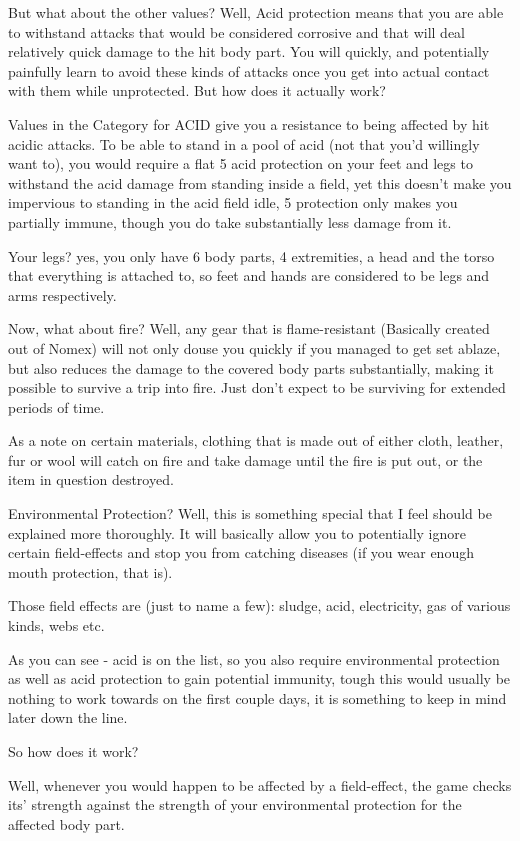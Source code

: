But what about the other values? Well, Acid protection means that you are able to withstand attacks that would be considered corrosive and that will deal relatively quick damage to the hit body part. You will quickly, and potentially painfully learn to avoid these kinds of attacks once you get into actual contact with them while unprotected. But how does it actually work?

Values in the Category for ACID give you a resistance to being affected by hit acidic attacks. To be able to stand in a pool of acid (not that you'd willingly want to), you would require a flat 5 acid protection on your feet and legs to withstand the acid damage from standing inside a field, yet this doesn't make you impervious to standing in the acid field idle, 5 protection only makes you partially immune, though you do take substantially less damage from it.

Your legs? yes, you only have 6 body parts, 4 extremities, a head and the torso that everything is attached to, so feet and hands are considered to be legs and arms respectively.

Now, what about fire? Well, any gear that is flame-resistant (Basically created out of Nomex) will not only douse you quickly if you managed to get set ablaze, but also reduces the damage to the covered body parts substantially, making it possible to survive a trip into fire. Just don't expect to be surviving for extended periods of time.

As a note on certain materials, clothing that is made out of either cloth, leather, fur or wool will catch on fire and take damage until the fire is put out, or the item in question destroyed.

Environmental Protection? Well, this is something special that I feel should be explained more thoroughly. It will basically allow you to potentially ignore certain field-effects and stop you from catching diseases (if you wear enough mouth protection, that is).

Those field effects are (just to name a few): sludge, acid, electricity, gas of various kinds, webs etc.

As you can see - acid is on the list, so you also require environmental protection as well as acid protection to gain potential immunity, tough this would usually be nothing to work towards on the first couple days, it is something to keep in mind later down the line.

So how does it work?

Well, whenever you would happen to be affected by a field-effect, the game checks its' strength against the strength of your environmental protection for the affected body part.

